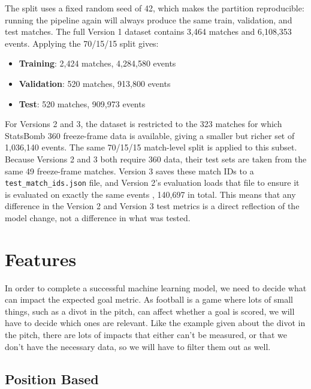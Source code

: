 \documentclass{article}
\begin{document}
The split uses a fixed random seed of 42, which makes the partition reproducible: running the pipeline again will always produce the same train, validation, and test matches. The full Version 1 dataset contains 3,464 matches and 6,108,353 events. Applying the 70/15/15 split gives:

\begin{itemize}
    \item \textbf{Training}: 2,424 matches, 4,284,580 events
    \item \textbf{Validation}: 520 matches, 913,800 events
    \item \textbf{Test}: 520 matches, 909,973 events
\end{itemize}

For Versions 2 and 3, the dataset is restricted to the 323 matches for which StatsBomb 360 freeze-frame data is available, giving a smaller but richer set of 1,036,140 events. The same 70/15/15 match-level split is applied to this subset. Because Versions 2 and 3 both require 360 data, their test sets are taken from the same 49 freeze-frame matches. Version 3 saves these match IDs to a \texttt{test\_match\_ids.json} file, and Version 2's evaluation loads that file to ensure it is evaluated on exactly the same events , 140,697 in total. This means that any difference in the Version 2 and Version 3 test metrics is a direct reflection of the model change, not a difference in what was tested.

\section{Features}\label{sec:features}

In order to complete a successful machine learning model, we need to decide what can impact the expected goal metric. As football is a game where lots of small things, such as a divot in the pitch, can affect whether a goal is scored, we will have to decide which ones are relevant. Like the example given about the divot in the pitch, there are lots of impacts that either can't be measured, or that we don't have the necessary data, so we will have to filter them out as well.

\subsection{Position Based}
\end{document}

